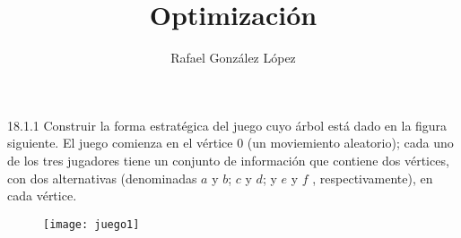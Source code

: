 \documentclass[twoside]{article}
\begin{document}
\title{Optimización}
\author{Rafael González López}
\maketitle

\begin{ejercicio}{18.1.1} Construir la forma estratégica del juego cuyo árbol está dado en la figura siguiente. El juego comienza en el vértice $0$ (un moviemiento aleatorio); cada uno de los tres jugadores tiene un conjunto de información que contiene dos vértices, con dos alternativas (denominadas $a$ y $b$; $c$ y $d$; y $e$ y $f$ , respectivamente), en cada vértice.
\begin{figure}[h!]
\centering
\texttt{[image: juego1]}
\end{figure}

\end{ejercicio}
\end{document}

